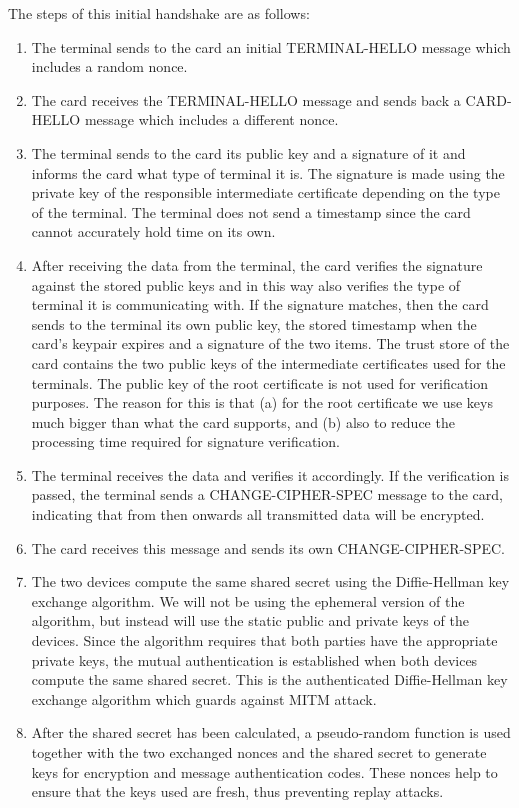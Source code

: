 \documentclass[a4paper,10pt]{llncs}
\begin{document}
The steps of this initial handshake are as follows:
\begin{enumerate}
 \item The terminal sends to the card an initial TERMINAL-HELLO message which includes a random nonce.
 \item The card receives the TERMINAL-HELLO message and sends back a CARD-HELLO message which includes a different nonce.
 \item The terminal sends to the card its public key and a signature of it and informs the card what type of terminal it is. The signature is made using the private key of the responsible intermediate certificate depending on the type of the terminal. The terminal does not send a timestamp since the card cannot accurately hold time on its own.
 \item After receiving the data from the terminal, the card verifies the signature against the stored public keys and in this way also verifies the type of terminal it is communicating with. If the signature matches, then the card sends to the terminal its own public key, the stored timestamp when the card's keypair expires and a signature of the two items. The trust store of the card contains the two public keys of the intermediate certificates used for the terminals. The public key of the root certificate is not used for verification purposes. The reason for this is that (a) for the root certificate we use keys much bigger than what the card supports, and (b) also to reduce the processing time required for signature verification.
 \item The terminal receives the data and verifies it accordingly. If the verification is passed, the terminal sends a CHANGE-CIPHER-SPEC message to the card, indicating that from then onwards all transmitted data will be encrypted.
 \item The card receives this message and sends its own CHANGE-CIPHER-SPEC.
 \item The two devices compute the same shared secret using the Diffie-Hellman key exchange algorithm. We will not be using the ephemeral version of the algorithm, but instead will use the static public and private keys of the devices. Since the algorithm requires that both parties have the appropriate private keys, the mutual authentication is established when both devices compute the same shared secret. This is the authenticated Diffie-Hellman key exchange algorithm which guards against MITM attack.
 \item After the shared secret has been calculated, a pseudo-random function is used together with the two exchanged nonces and the shared secret to generate keys for encryption and message authentication codes. These nonces help to ensure that the keys used are fresh, thus preventing replay attacks.
\end{enumerate}
\end{document}
